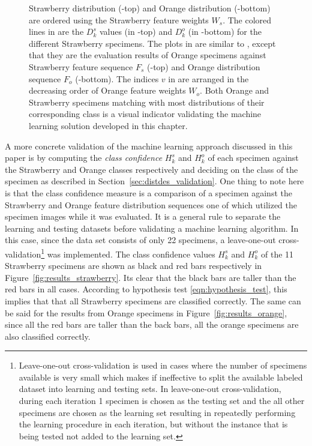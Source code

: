 \documentclass {udthesis}
\begin{document}
\begin{figure}
{Strawberry distribution (-top) and Orange distribution (-bottom) are ordered using the Strawberry feature weights $W_s$. The colored lines in  are the $D^s_k$ values (in -top) and $D^o_k$ (in -bottom) for the different Strawberry specimens. 
The plots in  are similar to , except that they are the evaluation results of Orange specimens against Strawberry feature sequence $F_s$ (-top) and Orange distribution sequence $F_o$ (-bottom). The indices $v$ in  are arranged in the decreasing order of Orange feature weights $W_o$. Both Orange and Strawberry specimens matching with most distributions of their corresponding class is a visual indicator validating the machine learning solution developed in this chapter.}
\label{fig:feat_results}
\end{figure}	
%

A more concrete validation of the machine learning approach discussed in this paper is by computing the \emph{class confidence} $H^s_k$ and $H^o_k$ of each specimen against the Strawberry and Orange classes respectively and deciding on the class of the specimen as described in Section~\ref{sec:distdes_validation}. One thing to note here is that the class confidence measure is a comparison of a specimen against the Strawberry and Orange feature distribution sequences one of which utilized the specimen images while it was evaluated. It is a general rule to separate the learning and testing datasets before validating a machine learning algorithm. In this case, since the data set consists of only 22 specimens, a leave-one-out cross-validation\footnote{Leave-one-out cross-validation is used in cases where the number of specimens available is very small which makes if ineffective to split the available labeled dataset into learning and testing sets. In leave-one-out cross-validation, during each iteration 1 
specimen is chosen as the testing set and the all other specimens are chosen as the learning set resulting in repeatedly performing the learning procedure in each iteration, but without the instance that is being tested not added to the learning set.} \cite{alpaydin} was implemented. The class confidence values $H^s_k$ and $H^o_k$ of the 11 Strawberry specimens are shown as black and red bars respectively in Figure~\ref{fig:results_strawberry}. Its clear that the black bars are taller than the red bars in all cases. According to hypothesis test \eqref{eqn:hypothesis_test}, this implies that that all Strawberry specimens are classified correctly. The same can be said for the results from Orange specimens in Figure~\ref{fig:results_orange}, since all the red bars are taller than the back bars, all the orange specimens are also classified correctly.
\end{document}

